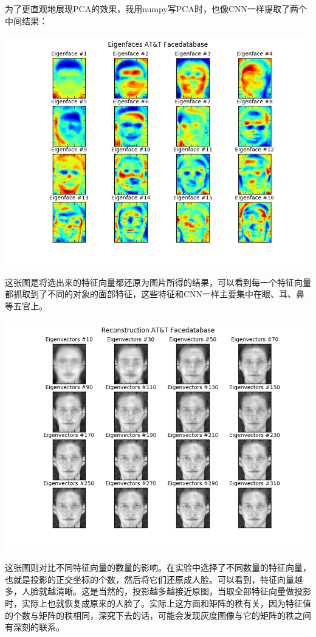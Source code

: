 \documentclass[12pt]{article}
\begin{document}
为了更直观地展现PCA的效果，我用numpy写PCA时，也像CNN一样提取了两个中间结果：

\begin{center}
\includegraphics[width=0.8\linewidth]{../image/eigenfaces.png}\\
\end{center}

这张图是将选出来的特征向量都还原为图片所得的结果，可以看到每一个特征向量都抓取到了不同的对象的面部特征，这些特征和CNN一样主要集中在眼、耳、鼻等五官上。

\begin{center}
\includegraphics[width=0.8\linewidth]{../image/eigenvectors.png}\\
\end{center}

这张图则对比不同特征向量的数量的影响。在实验中选择了不同数量的特征向量，也就是投影的正交坐标的个数，然后将它们还原成人脸。可以看到，特征向量越多，人脸就越清晰。这是当然的，投影越多越接近原图，当取全部特征向量做投影时，实际上也就恢复成原来的人脸了。实际上这方面和矩阵的秩有关，因为特征值的个数与矩阵的秩相同，深究下去的话，可能会发现灰度图像与它的矩阵的秩之间有深刻的联系。
\end{document}
